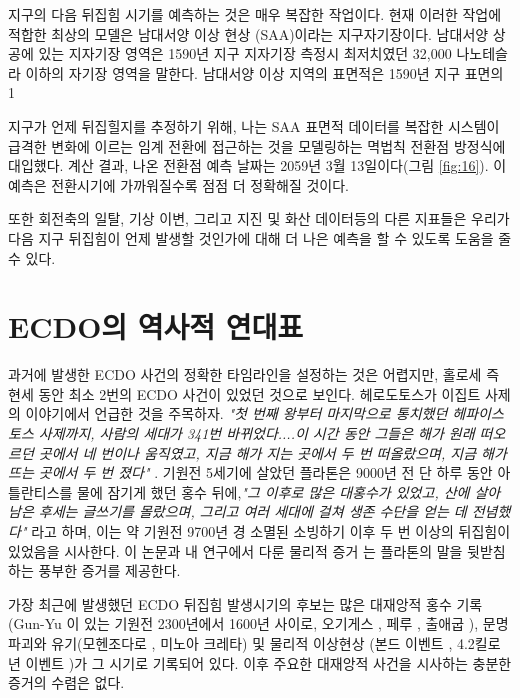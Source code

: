 \documentclass[10pt,twocolumn,letterpaper]{article}
\begin{document}
\begin{개요}
지구의 다음 뒤집힘 시기를 예측하는 것은 매우 복잡한 작업이다. 현재 이러한 작업에 적합한 최상의 모델은 남대서양 이상 현상 (SAA)이라는 지구자기장이다. 남대서양 상공에 있는 지자기장 영역은 1590년 지구 지자기장 측정시 최저치였던 32,000 나노테슬라 \cite{135}이하의 자기장 영역을 말한다. 남대서양 이상 지역의 표면적은 1590년 지구 표면의 1%


지구가 언제 뒤집힐지를 추정하기 위해, 나는 SAA 표면적 데이터를 복잡한 시스템이 급격한 변화에 이르는 임계 전환에 접근하는 것을 모델링하는 멱법칙 전환점 방정식에 대입했다. 계산 결과, 나온 전환점 예측 날짜는 2059년 3월 13일이다(그림 \ref{fig:16}). 이 예측은 전환시기에 가까워질수록 점점 더 정확해질 것이다\cite{136}.

또한 회전축의 일탈, 기상 이변, 그리고 지진 및 화산 데이터등의 다른 지표들은 우리가 다음 지구 뒤집힘이 언제 발생할 것인가에 대해 더 나은 예측을 할 수 있도록 도움을 줄 수 있다.

\section{ECDO의 역사적 연대표}

과거에 발생한  ECDO 사건의 정확한 타임라인을 설정하는 것은 어렵지만, 홀로세 즉 현세 동안 최소 2번의 ECDO 사건이 있었던 것으로 보인다. 헤로도토스가 이집트 사제의 이야기에서 언급한 것을 주목하자. \textit{"첫 번째 왕부터 마지막으로 통치했던 헤파이스토스 사제까지, 사람의 세대가 341번 바뀌었다....이 시간 동안 그들은 해가 원래 떠오르던 곳에서 네 번이나 움직였고, 지금 해가 지는 곳에서 두 번 떠올랐으며, 지금 해가 뜨는 곳에서 두 번 졌다"} \cite{32}. 기원전 5세기에 살았던 플라톤은 9000년 전 단 하루 동안 아틀란티스를 물에 잠기게 했던 홍수 뒤에,\textit{"그 이후로 많은 대홍수가 있었고, 산에 살아남은 후세는 글쓰기를 몰랐으며, 그리고  여러 세대에 걸쳐 생존 수단을 얻는 데 전념했다"} \cite{112}라고 하며, 이는 약 기원전 9700년 경 소멸된 소빙하기 이후 두 번 이상의 뒤집힘이 있었음을 시사한다. 이 논문과 내 연구에서 다룬 물리적 증거 \cite{2}는 플라톤의 말을 뒷받침하는 풍부한 증거를 제공한다.

가장 최근에 발생했던 ECDO 뒤집힘 발생시기의 후보는  많은 대재앙적 홍수 기록(Gun-Yu \cite{113,114,115}이 있는 기원전 2300년에서 1600년 사이로, 오기게스 \cite{116,117}, 페루 \cite{118,119}, 출애굽 \cite{120}), 문명 파괴와 유기(모헨조다로 \cite{121}, 미노아 크레타\cite{100,101}) 및 물리적 이상현상 (본드 이벤트 \cite{122}, 4.2킬로년 이벤트 \cite{90})가 그 시기로 기록되어 있다. 이후 주요한 대재앙적 사건을 시사하는 충분한 증거의 수렴은 없다.


\end{개요}
\end{document}
